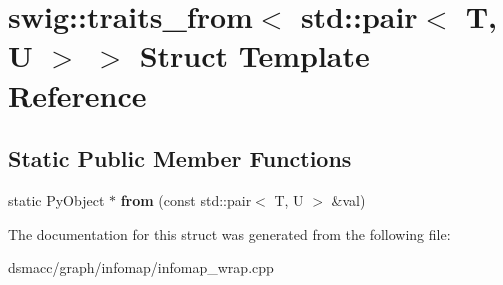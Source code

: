 \hypertarget{structswig_1_1traits__from_3_01std_1_1pair_3_01T_00_01U_01_4_01_4}{}\section{swig\+:\+:traits\+\_\+from$<$ std\+:\+:pair$<$ T, U $>$ $>$ Struct Template Reference}
\label{structswig_1_1traits__from_3_01std_1_1pair_3_01T_00_01U_01_4_01_4}
\subsection*{Static Public Member Functions}
\begin{DoxyCompactItemize}
\item 
\mbox{\label{structswig_1_1traits__from_3_01std_1_1pair_3_01T_00_01U_01_4_01_4_a8d5dbe4816fb56349947140186869e95}} 
static Py\+Object $\ast$ {\bfseries from} (const std\+::pair$<$ T, U $>$ \&val)
\end{DoxyCompactItemize}


The documentation for this struct was generated from the following file\+:\begin{DoxyCompactItemize}
\item 
dsmacc/graph/infomap/infomap\+\_\+wrap.\+cpp\end{DoxyCompactItemize}
